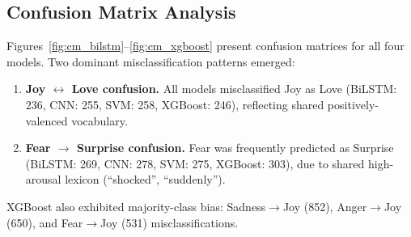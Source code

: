 \begin{table}[!htb]
\centering
\caption{Best hyperparameter configurations per model.}
\label{tab:hyperparams}
\end{table}

\subsection{Confusion Matrix Analysis}

Figures~\ref{fig:cm_bilstm}--\ref{fig:cm_xgboost} present confusion matrices for all four models. Two dominant misclassification patterns emerged:

\begin{enumerate}[nosep]
    \item \textbf{Joy $\leftrightarrow$ Love confusion.} All models misclassified Joy as Love (BiLSTM: 236, CNN: 255, SVM: 258, XGBoost: 246), reflecting shared positively-valenced vocabulary.
    \item \textbf{Fear $\rightarrow$ Surprise confusion.} Fear was frequently predicted as Surprise (BiLSTM: 269, CNN: 278, SVM: 275, XGBoost: 303), due to shared high-arousal lexicon (``shocked'', ``suddenly'').
\end{enumerate}

XGBoost also exhibited majority-class bias: Sadness$\rightarrow$Joy (852), Anger$\rightarrow$Joy (650), and Fear$\rightarrow$Joy (531) misclassifications.


